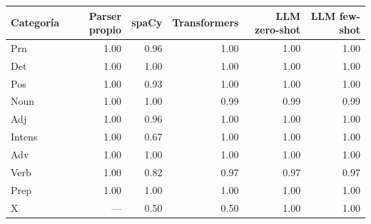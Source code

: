 \begin{tabular}{lrrrrr}
\toprule
Categoría & Parser propio & spaCy & Transformers & LLM zero-shot & LLM few-shot \\
\midrule
Prn & 1.00 & 0.96 & 1.00 & 1.00 & 1.00 \\
Det & 1.00 & 1.00 & 1.00 & 1.00 & 1.00 \\
Pos & 1.00 & 0.93 & 1.00 & 1.00 & 1.00 \\
Noun & 1.00 & 1.00 & 0.99 & 0.99 & 0.99 \\
Adj & 1.00 & 0.96 & 1.00 & 1.00 & 1.00 \\
Intens & 1.00 & 0.67 & 1.00 & 1.00 & 1.00 \\
Adv & 1.00 & 1.00 & 1.00 & 1.00 & 1.00 \\
Verb & 1.00 & 0.82 & 0.97 & 0.97 & 0.97 \\
Prep & 1.00 & 1.00 & 1.00 & 1.00 & 1.00 \\
X & --- & 0.50 & 0.50 & 1.00 & 1.00 \\
\bottomrule
\end{tabular}
